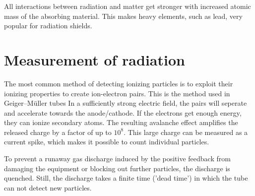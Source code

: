 All interactions between radiation and matter get stronger with increased atomic mass of the absorbing material.
This makes heavy elements, such as lead, very popular for radiation shields.

\section{Measurement of radiation}
The most common method of detecting ionizing particles is to exploit their ionizing properties to create ion-electron pairs.
This is the method used in Geiger–Müller tubes
In a sufficiently strong electric field, the pairs will seperate and accelerate towards the anode/cathode.
If the electrons get enough energy, they can ionize secondary atoms.
The resulting avalanche effect amplifies the released charge by a factor of up to $10^8$.
This large charge can be measured as a current spike, which makes it possible to count individual particles.

To prevent a runaway gas discharge induced by the positive feedback from damaging the equipment or blocking out further particles, the discharge is quenched.
Still, the discharge takes a finite time ('dead time') in which the tube can not detect new particles.

